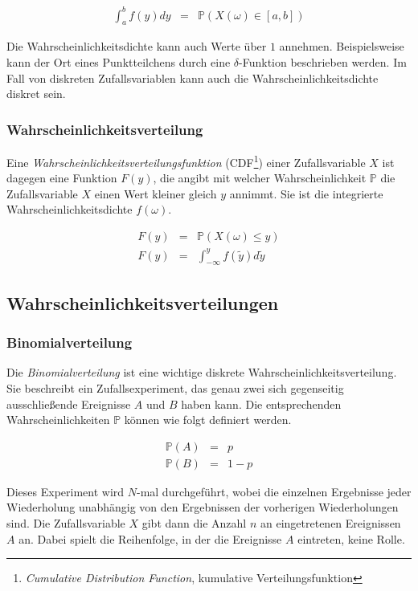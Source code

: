 \documentclass[12pt,a4paper]{scrartcl}
\numberwithin{equation}{section} %
\begin{document}
\begin{eqnarray}
	\int_{a}^{b} f(y) dy &=& \mathbb P(X(\omega) \in [a,b])
	\label{eq:wahrscheinlichkeitsdichte}
\end{eqnarray}

\noindent
Die Wahrscheinlichkeitsdichte kann auch Werte über $1$ annehmen. Beispielsweise kann der Ort eines Punktteilchens durch eine $\delta$-Funktion beschrieben werden. Im Fall von diskreten Zufallsvariablen kann auch die Wahrscheinlichkeitsdichte diskret sein.

\subsubsection{Wahrscheinlichkeitsverteilung}
\label{Wahrscheinlichkeitsverteilung}
Eine \emph{Wahrscheinlichkeitsverteilungsfunktion} (CDF\footnote{\emph{Cumulative Distribution Function}, kumulative Verteilungsfunktion}) einer Zufallsvariable $X$ ist dagegen eine Funktion $F(y)$, die angibt mit welcher Wahrscheinlichkeit $\mathbb P$ die Zufallsvariable $X$ einen Wert kleiner gleich $y$ annimmt. Sie ist die integrierte Wahrscheinlichkeitsdichte $f(\omega)$.

\begin{eqnarray}
	F(y) &=& \mathbb P(X(\omega) \leq y) \\
	F(y) &=& \int_{- \infty}^{y} f(\tilde{y}) d\tilde{y}
\end{eqnarray}

\subsection{Wahrscheinlichkeitsverteilungen}
\label{Wahrscheinlichkeitsverteilungen}

\subsubsection{Binomialverteilung}
\label{Binomialverteilung}
Die \emph{Binomialverteilung} ist eine wichtige diskrete Wahrscheinlichkeitsverteilung. Sie beschreibt ein Zufallsexperiment, das genau zwei sich gegenseitig ausschließende Ereignisse $A$ und $B$ haben kann. Die entsprechenden Wahrscheinlichkeiten $\mathbb P$ können wie folgt definiert werden.

\begin{eqnarray}
	\mathbb P(A) &=& p \\
	\mathbb P(B) &=& 1 - p
\end{eqnarray}

\noindent
Dieses Experiment wird $N$-mal durchgeführt, wobei die einzelnen Ergebnisse jeder Wiederholung unabhängig von den Ergebnissen der vorherigen Wiederholungen sind. Die Zufallsvariable $X$ gibt dann die Anzahl $n$ an eingetretenen Ereignissen $A$ an. Dabei spielt die Reihenfolge, in der die Ereignisse $A$ eintreten, keine Rolle.
\end{document}
